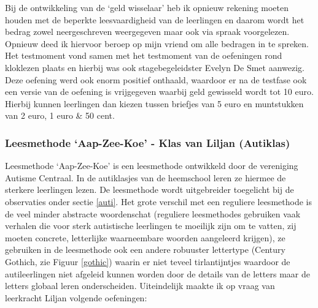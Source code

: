 \documentclass[a4paper,11pt]{article}
\theoremstyle{definition}
\begin{document}
\noindent Bij de ontwikkeling van de `geld wisselaar' heb ik opnieuw rekening 
moeten houden met de beperkte leesvaardigheid van de leerlingen en daarom wordt 
het bedrag zowel neergeschreven weergegeven maar ook via spraak voorgelezen. 
Opnieuw deed ik hiervoor beroep op mijn vriend om alle bedragen in te spreken. \\

\noindent Het testmoment vond samen met het testmoment van de oefeningen rond kloklezen 
plaats en hierbij was ook stagebegeleidster Evelyn De Smet aanwezig. Deze 
oefening werd ook enorm positief onthaald, waardoor er na de testfase ook een 
versie van de oefening is vrijgegeven waarbij geld gewisseld wordt tot 10 euro. 
Hierbij kunnen leerlingen dan kiezen tussen briefjes van 5 euro en muntstukken 
van 2 euro, 1 euro \& 50 cent.



\subsubsection{Leesmethode `Aap-Zee-Koe' - Klas van Liljan (Autiklas)}
Leesmethode `Aap-Zee-Koe' is een leesmethode ontwikkeld door de vereniging 
Autisme Centraal. In de autiklasjes van de heemschool leren ze hiermee de 
sterkere leerlingen lezen. De leesmethode wordt uitgebreider toegelicht bij de observaties onder sectie \ref{auti}. Het grote verschil met een reguliere leesmethode is de veel minder abstracte woordenschat (reguliere leesmethodes gebruiken vaak verhalen die voor sterk
autistische leerlingen te moeilijk zijn om te vatten, zij moeten concrete, letterlijke waarneembare woorden aangeleerd krijgen), 
ze gebruiken in de leesmethode ook een andere robuuster lettertype (Century Gothich, zie Figuur \ref{gothic}) waarin er niet teveel 
tirlantijntjes waardoor de autileerlingen niet afgeleid kunnen worden door de 
details van de letters maar de letters globaal leren onderscheiden. Uiteindelijk 
maakte ik op vraag van leerkracht Liljan volgende oefeningen:
\end{document}
